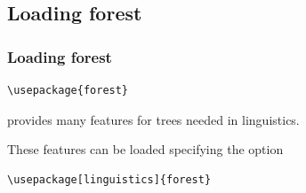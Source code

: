 \subsection{Loading forest}

\begin{frame}[fragile]
\frametitle{Loading forest}


\begin{lstlisting}
\usepackage{forest}
\end{lstlisting}

 provides many features for trees needed in linguistics. 

These features can be loaded specifying the option 

\begin{lstlisting}
\usepackage[linguistics]{forest}
\end{lstlisting}

%
%


\end{frame}
